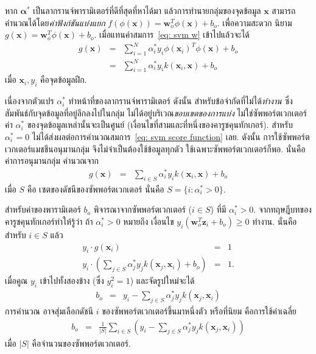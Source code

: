 หาก $\bm{\alpha}^\ast$ เป็นลากรานจ์พารามิเตอร์ที่ดีที่สุดที่หาได้มา
แล้วการทำนายกลุ่มของจุดข้อมูล $\bm{x}$
สามารถคำนวณได้โดย\textit{ค่าฟังก์ชันแบ่งแยก} $f(\phi(\bm{x})) = \bm{w}_o^T \phi(\bm{x}) + b_o$.
เพื่อความสะดวก นิยาม $g(\bm{x}) =  \bm{w}_o^T \phi(\bm{x}) + b_o$.
เมื่อแทนค่าสมการ~\ref{eq: svm w} เข้าไปแล้วจะได้
\begin{eqnarray}
g(\bm{x}) &=& \sum_{i=1}^N \alpha^\ast_i y_i \phi(\bm{x}_i)^T \phi(\bm{x}) + b_o
\nonumber \\
&=& \sum_{i=1}^N \alpha^\ast_i y_i k(\bm{x}_i,\bm{x}) + b_o
\label{eq: svm score function}
\end{eqnarray}
เมื่อ $\bm{x}_i, y_i$ คือจุดข้อมูลฝึก.

เนื่องจากตัวแปร $\alpha^\ast_i$ ทำหน้าที่ของลากรานจ์พารามิเตอร์
ดังนั้น สำหรับข้อจำกัดที่ไม่ได้\textit{ทำงาน} 
ซึ่งสัมพันธ์กับจุดข้อมูลที่อยู่ลึกลงไปในกลุ่ม ไม่ได้อยู่บริเวณ\textit{ขอบเขตของการแบ่ง}
ไม่ใช่ซัพพอร์ตเวกเตอร์ 
ค่า $\alpha^\ast_i$ ของจุดข้อมูลเหล่านั้นจะเป็นศูนย์ (เงื่อนไขที่สามและที่หนึ่งของคารูชคุนทักเกอร์).
สำหรับ $\alpha^\ast_i = 0$ ไม่ได้ส่งผลต่อการคำนวณสมการ~\ref{eq: svm score function} เลย.
ดังนั้น การใช้ซัพพอร์ตเวกเตอร์แมชชีนอนุมานกลุ่ม จึงไม่จำเป็นต้องใช้ข้อมูลทุกตัว
ใช้เฉพาะซัพพอร์ตเวกเตอร์ก็พอ.
นั่นคือ ค่าการอนุมานกลุ่ม คำนวณจาก
\begin{eqnarray}
g(\bm{x}) 
&=& \sum_{i \in S} \alpha^\ast_i y_i k(\bm{x}_i,\bm{x}) + b_o
\label{eq: svm discriminant function support vectors}
\end{eqnarray}
เมื่อ $S$ คือ 
เซตของดัชนีของซัพพอร์ตเวกเตอร์
นั่นคือ
$S = \{i: \alpha^\ast_i > 0\}$.

สำหรับค่าของพารามิเตอร์ $b_o$ พิจารณาจากซัพพอร์ตเวกเตอร์ ($i \in S$)
ที่มี $\alpha^\ast_i > 0$.
จากทฤษฎีบทของคารูชคุนทักเกอร์ทำให้รู้ว่า
ถ้า $\alpha^\ast_i > 0$ หมายถึง เงื่อนไข $y_i (\bm{w}_o^T \bm{z}_i + b_o) \geq 0$ ทำงาน.
นั่นคือ
สำหรับ $i \in S$ แล้ว
\begin{eqnarray}
y_i \cdot g(\bm{x}_i) &=& 1
\label{eq: svm active constraints for b} \\
y_i \cdot (\sum_{j \in S} \alpha^\ast_j y_j k(\bm{x}_j,\bm{x}_i) + b_o) &=& 1
\label{eq: svm solve for b}.
\end{eqnarray}
เมื่อคูณ $y_i$ เข้าไปทั้งสองข้าง (ซึ่ง $y_i^2 = 1$) และจัดรูปใหม่จะได้
\begin{eqnarray}
b_o &=& y_i - \sum_{j \in S} \alpha^\ast_j y_j k(\bm{x}_j,\bm{x}_i)
\nonumber
\end{eqnarray}
การคำนวณ อาจสุ่มเลือกดัชนี $i$ ของซัพพอร์ตเวกเตอร์ขึ้นมาหนึ่งตัว
หรือที่นิยม\cite{Haykin2009a} คือการใช้ค่าเฉลี่ย
\begin{eqnarray}
b_o &=& \frac{1}{|S|} \sum_{i \in S} \left( y_i - \sum_{j \in S} \alpha^\ast_j y_j k(\bm{x}_j,\bm{x}_i) \right)
\label{eq: svm b}
\end{eqnarray}
เมื่อ $|S|$ คือจำนวนของซัพพอร์ตเวกเตอร์.

